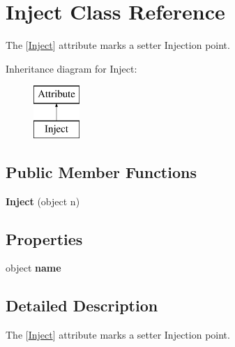 \hypertarget{class_inject}{\section{Inject Class Reference}
\label{class_inject}
}


The {\ttfamily \mbox{[}\hyperlink{class_inject}{Inject}\mbox{]}} attribute marks a setter Injection point.  


Inheritance diagram for Inject\-:\begin{figure}[H]
\begin{center}
\leavevmode
\includegraphics[height=2.000000cm]{class_inject}
\end{center}
\end{figure}
\subsection*{Public Member Functions}
\begin{DoxyCompactItemize}
\item 
\hypertarget{class_inject_ad157d14fd18b041da3a751ee41161aef}{{\bfseries Inject} (object n)}\label{class_inject_ad157d14fd18b041da3a751ee41161aef}

\end{DoxyCompactItemize}
\subsection*{Properties}
\begin{DoxyCompactItemize}
\item 
\hypertarget{class_inject_af269f593cee42918b948497e4dfb3a3d}{object {\bfseries name}}\label{class_inject_af269f593cee42918b948497e4dfb3a3d}

\end{DoxyCompactItemize}


\subsection{Detailed Description}
The {\ttfamily \mbox{[}\hyperlink{class_inject}{Inject}\mbox{]}} attribute marks a setter Injection point. 

